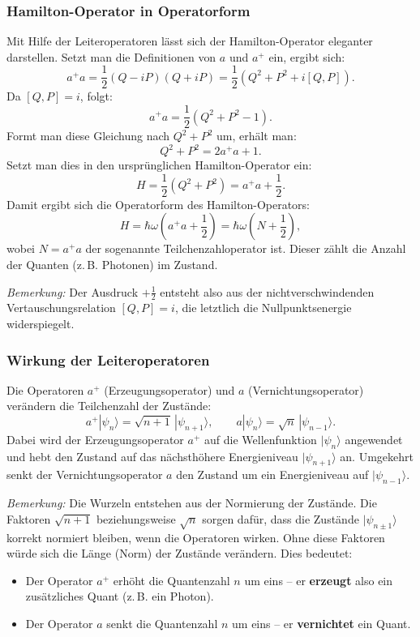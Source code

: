 		\subsubsection{Hamilton-Operator in Operatorform\label{fourier:subsubsection:HamiltonOperatorInOperatorform}}

			Mit Hilfe der Leiteroperatoren lässt sich der Hamilton-Operator eleganter darstellen. Setzt man die Definitionen von $a$ und $a^+$ ein, ergibt sich:
			\[
				a^+a = \frac{1}{2}(Q - iP)(Q + iP) = \frac{1}{2}(Q^2 + P^2 + i[Q, P]).
			\]
			Da $[Q, P] = i$, folgt:
			\[
				a^+a = \frac{1}{2}(Q^2 + P^2 - 1).
			\]
			Formt man diese Gleichung nach $Q^2 + P^2$ um, erhält man:
			\[
				Q^2 + P^2 = 2a^+a + 1.
			\]
			Setzt man dies in den ursprünglichen Hamilton-Operator ein:
			\[
				H = \frac{1}{2}(Q^2 + P^2) = a^+a + \frac{1}{2}.
			\]
			Damit ergibt sich die Operatorform des Hamilton-Operators:
			\begin{equation}
				H = \hbar\omega \left(a^+ a + \frac{1}{2}\right) = \hbar\omega \left(N + \frac{1}{2}\right),
			\end{equation}
			wobei $N = a^+a$ der sogenannte Teilchenzahloperator ist. Dieser zählt die Anzahl der Quanten (z.\,B. Photonen) im Zustand.

			\textit{Bemerkung:}
			Der Ausdruck $+\tfrac{1}{2}$ entsteht also aus der nichtverschwindenden Vertauschungsrelation $[Q,P] = i$, die letztlich die Nullpunktsenergie widerspiegelt.

		\subsubsection{Wirkung der Leiteroperatoren\label{fourier:subsubsection:WirkungLeiteroperatoren}}
			Die Operatoren $a^+$ (Erzeugungsoperator) und $a$ (Vernichtungsoperator) verändern die Teilchenzahl der Zustände:
			\[
				a^+|\psi_n\rangle = \sqrt{n+1}\,|\psi_{n+1}\rangle,
				\qquad
				a|\psi_n\rangle = \sqrt{n}\,|\psi_{n-1}\rangle.
			\]
			Dabei wird der Erzeugungsoperator $a^+$ auf die Wellenfunktion $|\psi_n\rangle$ angewendet und hebt den Zustand auf das nächsthöhere Energieniveau $|\psi_{n+1}\rangle$ an.
			Umgekehrt senkt der Vernichtungsoperator $a$ den Zustand um ein Energieniveau auf $|\psi_{n-1}\rangle$.
			
			\textit{Bemerkung:} 
			Die Wurzeln entstehen aus der Normierung der Zustände.
			Die Faktoren $\sqrt{n+1}$ beziehungsweise $\sqrt{n}$ sorgen dafür, dass die Zustände $|\psi_{n\pm1}\rangle$ korrekt normiert bleiben, wenn die Operatoren wirken.
			Ohne diese Faktoren würde sich die Länge (Norm) der Zustände verändern.
			Dies bedeutet:
			\begin{itemize}
				\item Der Operator $a^+$ erhöht die Quantenzahl $n$ um eins – er \textbf{erzeugt} also ein zusätzliches Quant (z.\,B. ein Photon).
				\item Der Operator $a$ senkt die Quantenzahl $n$ um eins – er \textbf{vernichtet} ein Quant.
			\end{itemize}

